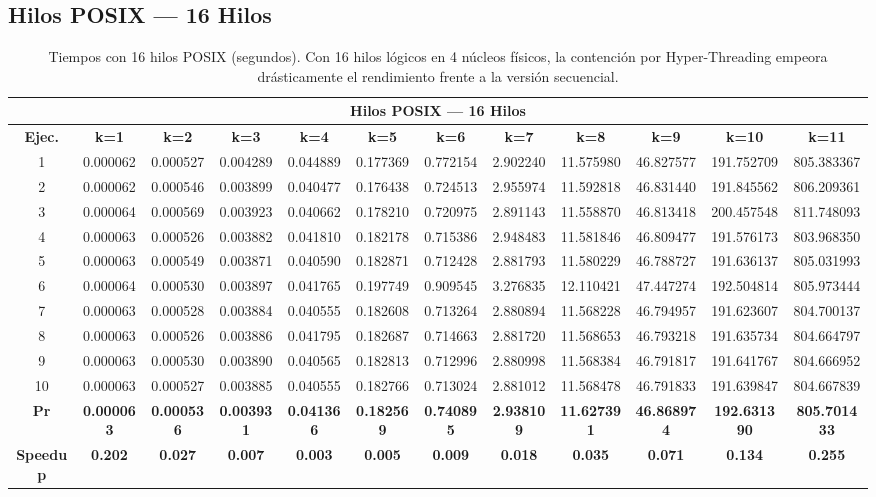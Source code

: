 \documentclass{article}
\begin{document}
\subsection{Hilos POSIX --- 16 Hilos}

\begin{table}[H]
\centering
\tiny
\begin{tabular}{|c|c|c|c|c|c|c|c|c|c|c|c|}
\hline
\multicolumn{12}{|c|}{\textbf{Hilos POSIX --- 16 Hilos}} \\
\hline
\textbf{Ejec.} & \textbf{k=1} & \textbf{k=2} & \textbf{k=3} & \textbf{k=4} & \textbf{k=5} & \textbf{k=6} & \textbf{k=7} & \textbf{k=8} & \textbf{k=9} & \textbf{k=10} & \textbf{k=11} \\
\hline
1  & 0.000062 & 0.000527 & 0.004289 & 0.044889 & 0.177369 & 0.772154 & 2.902240 & 11.575980 & 46.827577 & 191.752709 & 805.383367 \\
2  & 0.000062 & 0.000546 & 0.003899 & 0.040477 & 0.176438 & 0.724513 & 2.955974 & 11.592818 & 46.831440 & 191.845562 & 806.209361 \\
3  & 0.000064 & 0.000569 & 0.003923 & 0.040662 & 0.178210 & 0.720975 & 2.891143 & 11.558870 & 46.813418 & 200.457548 & 811.748093 \\
4  & 0.000063 & 0.000526 & 0.003882 & 0.041810 & 0.182178 & 0.715386 & 2.948483 & 11.581846 & 46.809477 & 191.576173 & 803.968350 \\
5  & 0.000063 & 0.000549 & 0.003871 & 0.040590 & 0.182871 & 0.712428 & 2.881793 & 11.580229 & 46.788727 & 191.636137 & 805.031993 \\
6  & 0.000064 & 0.000530 & 0.003897 & 0.041765 & 0.197749 & 0.909545 & 3.276835 & 12.110421 & 47.447274 & 192.504814 & 805.973444 \\
7  & 0.000063 & 0.000528 & 0.003884 & 0.040555 & 0.182608 & 0.713264 & 2.880894 & 11.568228 & 46.794957 & 191.623607 & 804.700137 \\
8  & 0.000063 & 0.000526 & 0.003886 & 0.041795 & 0.182687 & 0.714663 & 2.881720 & 11.568653 & 46.793218 & 191.635734 & 804.664797 \\
9  & 0.000063 & 0.000530 & 0.003890 & 0.040565 & 0.182813 & 0.712996 & 2.880998 & 11.568384 & 46.791817 & 191.641767 & 804.666952 \\
10 & 0.000063 & 0.000527 & 0.003885 & 0.040555 & 0.182766 & 0.713024 & 2.881012 & 11.568478 & 46.791833 & 191.639847 & 804.667839 \\
\hline
\textbf{Pr} & \textbf{0.000063} & \textbf{0.000536} & \textbf{0.003931} & \textbf{0.041366} & \textbf{0.182569} & \textbf{0.740895} & \textbf{2.938109} & \textbf{11.627391} & \textbf{46.868974} & \textbf{192.631390} & \textbf{805.701433} \\
\hline
\textbf{Speedup} & \textbf{0.202} & \textbf{0.027} & \textbf{0.007} & \textbf{0.003} & \textbf{0.005} & \textbf{0.009} & \textbf{0.018} & \textbf{0.035} & \textbf{0.071} & \textbf{0.134} & \textbf{0.255} \\
\hline
\end{tabular}
\caption{Tiempos con 16 hilos POSIX (segundos). Con 16 hilos lógicos en 4 núcleos físicos, la contención por Hyper-Threading empeora drásticamente el rendimiento frente a la versión secuencial.}
\label{tab:t16}
\end{table}
\end{document}
